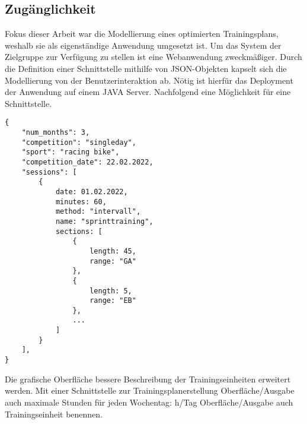 \subsection{Zugänglichkeit}
Fokus dieser Arbeit war die Modellierung eines optimierten Trainingsplans, weshalb sie als eigenständige Anwendung umgesetzt ist. Um das System der Zielgruppe zur Verfügung zu stellen ist eine Webanwendung zweckmäßiger. 
Durch die Definition einer Schnittstelle mithilfe von JSON-Objekten kapselt sich die Modellierung von der Benutzerinteraktion ab. Nötig ist hierfür das Deployment der Anwendung auf einem JAVA Server. Nachfolgend eine Möglichkeit für eine Schnittstelle.
\begin{minipage}{\linewidth}
\begin{lstlisting}
{ 
    "num_months": 3,
    "competition": "singleday",
    "sport": "racing bike",
    "competition_date": 22.02.2022,
    "sessions": [
        {
            date: 01.02.2022,
            minutes: 60,
            method: "intervall",
            name: "sprinttraining", 
            sections: [
                {
                    length: 45,
                    range: "GA"
                },
                {
                    length: 5,
                    range: "EB"
                },
                ...
            ]
        }
    ], 
}
\end{lstlisting}
\end{minipage}
Die grafische Oberfläche bessere Beschreibung der Trainingseinheiten erweitert werden. 
Mit einer Schnittstelle zur Trainingsplanerstellung Oberfläche/Ausgabe auch maximale Stunden für jeden Wochentag: h/Tag
Oberfläche/Ausgabe auch Trainingseinheit benennen.

